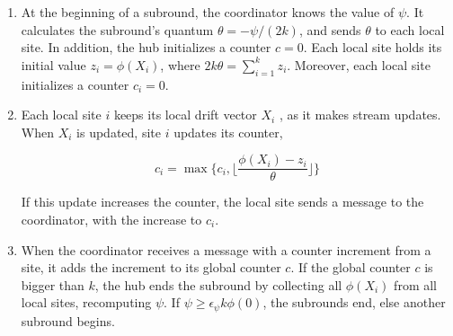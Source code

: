 \begin{enumerate}
    \item At the beginning of a subround, the coordinator knows the value of $\psi$.
    It calculates the subround’s quantum $\theta = -\psi /(2k)$, and sends $\theta$ to each local site.
    In addition, the hub initializes a counter $c = 0$.
    Each local site holds its initial value $z_i = \phi(X_i)$, where $2k\theta = \sum_{i=1}^{k} z_i$.
    Moreover, each local site initializes a counter $c_i = 0$.
    \item Each local site $i$ keeps its local drift vector $X_i$ , as it makes stream updates.
    When $X_i$ is updated, site $i$ updates its counter,
    
    \begin{equation}
        c_i = \max\{c_i, \lfloor\frac{\phi(X_i) - z_i}{\theta}\rfloor\} \label{eq:equation34b}
    \end{equation}

    If this update increases the counter, the local site sends a message to the coordinator, with the increase to $c_i$.
    \item When the coordinator receives a message with a counter increment from a site, it adds the increment to its global counter $c$.
    If the global counter $c$ is bigger than $k$, the hub ends the subround by collecting all $\phi(X_i)$ from all local sites, recomputing $\psi$.
    If $\psi \geq \epsilon_\psi k \phi(0)$, the subrounds end, else another subround begins.
\end{enumerate}
